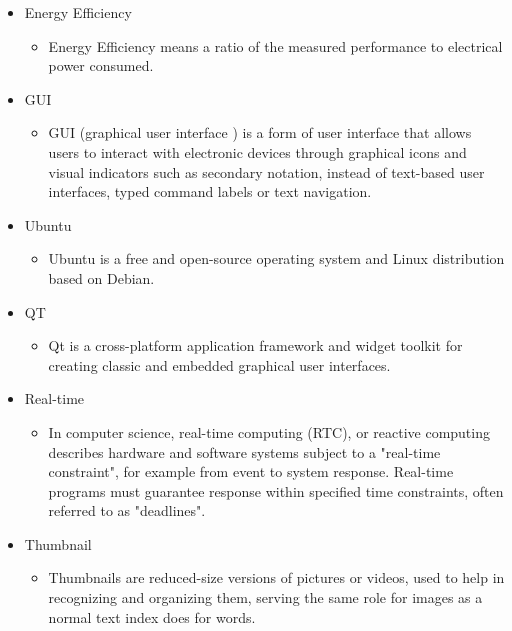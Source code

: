 \documentclass[parskip=full]{scrartcl}
\begin{document}
\begin{itemize}
	
	\item Energy Efficiency
	\begin{itemize}
		\item Energy Efficiency means a ratio of the measured performance to electrical power consumed.
	\end{itemize}
	
	
	\item GUI
	\begin{itemize}
		\item GUI (graphical user interface ) is a form of user interface that allows users to interact with electronic devices through graphical icons and visual indicators such as secondary notation, instead of text-based user interfaces, typed command labels or text navigation.
	\end{itemize}
	
	
	\item Ubuntu
	\begin{itemize}
		\item Ubuntu is a free and open-source operating system and Linux distribution based on Debian.
	\end{itemize}
	
	
	\item QT
	\begin{itemize}
		\item Qt is a cross-platform application framework and widget toolkit for creating classic and embedded graphical user interfaces.
	\end{itemize}
	
	
	\item Real-time
	\begin{itemize}
		\item In computer science, real-time computing (RTC), or reactive computing describes hardware and software systems subject to a "real-time constraint", for example from event to system response. Real-time programs must guarantee response within specified time constraints, often referred to as "deadlines".
	\end{itemize}
	
	
	\item Thumbnail
	\begin{itemize}
		\item Thumbnails are reduced-size versions of pictures or videos, used to help in recognizing and organizing them, serving the same role for images as a normal text index does for words.
	\end{itemize}
\end{itemize}
\end{document}

